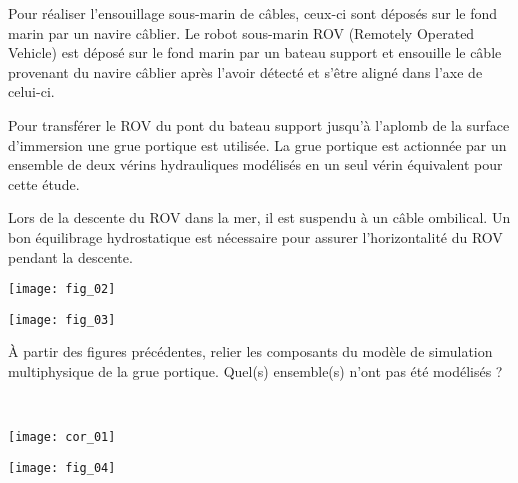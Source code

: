 \ifprof
\else
Pour réaliser l’ensouillage sous-marin de câbles, ceux-ci sont déposés sur le fond marin par un navire câblier. Le robot sous-marin ROV (Remotely Operated Vehicle) est déposé sur le fond marin par un bateau support et ensouille le câble provenant
du navire câblier après l’avoir détecté et s’être aligné dans l’axe de celui-ci.

Pour transférer le ROV du pont du bateau support jusqu’à l’aplomb de la surface d’immersion une grue portique est utilisée. 
La grue portique est actionnée par un ensemble de deux vérins hydrauliques modélisés en un seul vérin équivalent pour cette étude.

Lors de la descente du ROV dans la mer, il est suspendu à un câble ombilical. Un bon équilibrage hydrostatique est
nécessaire pour assurer l’horizontalité du ROV pendant la descente.


\begin{center}
\texttt{[image: fig\_02]}
\end{center}

\begin{center}
\texttt{[image: fig\_03]}
\end{center}
\fi

\begin{question}
À partir des figures précédentes, relier les composants du modèle de simulation
multiphysique de la grue portique. Quel(s) ensemble(s) n’ont pas été modélisés ?
\end{question}

\ifprof
\begin{corrige}~\\

\begin{center}
\texttt{[image: cor\_01]}
\end{center}
\end{corrige}
\else
\fi


\ifprof
\else
\begin{center}
\texttt{[image: fig\_04]}
\end{center}
\fi
